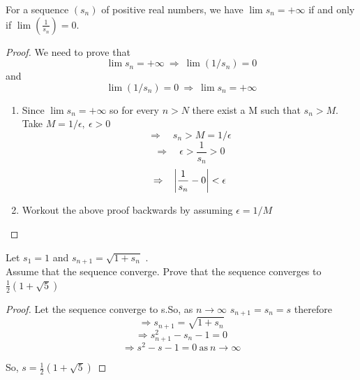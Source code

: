 \documentclass{notes}
\begin{document}



\begin{problem}
	For a sequence $(s_n)$ of positive real numbers, we have $\lim s_n = +\infty $
	if and only if $ \lim ( \frac{1}{s_n})=0$.
	
\end{problem}

\begin{proof}
	We need to prove that
	$$\lim s_n  =+\infty \ \Rightarrow\ \lim (1/s_n)=0$$
	and
	$$\lim (1/s_n)=0 \ \Rightarrow\ \lim s_n  =+\infty$$
	\begin{enumerate}
		\item 
		Since $\lim s_n = +\infty$ so for every $n>N$ there exist a M such that $s_n >M$. Take $M= 1/\epsilon,\ \epsilon >0$
		$$\Rightarrow\quad s_n>M=1/\epsilon $$
		$$\Rightarrow\quad \epsilon>\frac{1}{s_n}>0$$
		$$\Rightarrow\quad\abs{\frac{1}{s_n}-0} <\epsilon$$   
		\item
		Workout the above proof backwards by assuming $\epsilon=1/M$
	\end{enumerate}
\end{proof}

\begin{problem}
	Let $s_1 = 1$ and $s_{n+1} = \sqrt{1+s_n}$ .\\
	Assume that the sequence converge. Prove that the sequence converges to $\frac{1}{2} (1+\sqrt{5})$
\end{problem}
\begin{proof}
	Let the sequence converge to s.So, as  $n\to \infty$ $s_{n+1} = s_n = s$ therefore
	$$\Rightarrow s_{n+1}=\sqrt{1+s_n}$$
	$$\Rightarrow s_{n+1} ^2 - s_n -1 = 0$$
	$$\Rightarrow s^2 -s-1=0\ \mathrm{as}\ n\to \infty$$
	
	So, ${s = \frac{1}{2}(1+\sqrt{5})}$
\end{proof}
\end{document}
